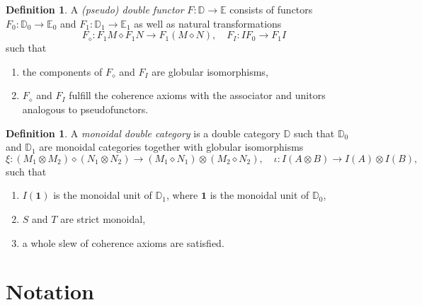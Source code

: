 \documentclass[11pt]{report}
\theoremstyle{definition}
\newtheorem{definition}[theorem]{Definition}
\theoremstyle{remark}
\theoremstyle{remark}
\begin{document}
\begin{definition}
A \emph{(pseudo) double functor} $F: \mathbb{D} \to \mathbb{E}$ consists of functors $F_0: \mathbb{D}_0 \to \mathbb{E}_0$ and $F_1: \mathbb{D}_1 \to \mathbb{E}_1$ as well as natural transformations
\begin{equation*}
F_\diamond: F_1 M \diamond F_1 N \to F_1(M \diamond N), \quad F_I: I F_0 \to F_1 I
\end{equation*}
such that
\begin{enumerate}[label=(\roman*)]
\item the components of $F_\diamond$ and $F_I$ are globular isomorphisms,
\item $F_\diamond$ and $F_I$ fulfill the coherence axioms with the associator and unitors analogous to pseudofunctors.
\end{enumerate}
\end{definition}

\begin{definition}
A \emph{monoidal double category} is a double category $\mathbb{D}$ such that $\mathbb{D}_0$ and $\mathbb{D}_1$ are monoidal categories together with globular isomorphisms
\begin{equation*}
\xi: (M_1 \otimes M_2) \diamond (N_1 \otimes N_2) \to (M_1 \diamond N_1) \otimes (M_2 \diamond N_2), \quad \iota: I(A \otimes B) \to I(A) \otimes I(B),
\end{equation*}
such that
\begin{enumerate}[label=(\roman*)]
\item $I(\mathbf{1})$ is the monoidal unit of $\mathbb{D}_1$, where $\mathbf{1}$ is the monoidal unit of $\mathbb{D}_0$,
\item $S$ and $T$ are strict monoidal,
\item a whole slew of coherence axioms are satisfied.
\end{enumerate}
\end{definition}


\chapter*{Notation}\label{chapter:notation}
\end{document}
